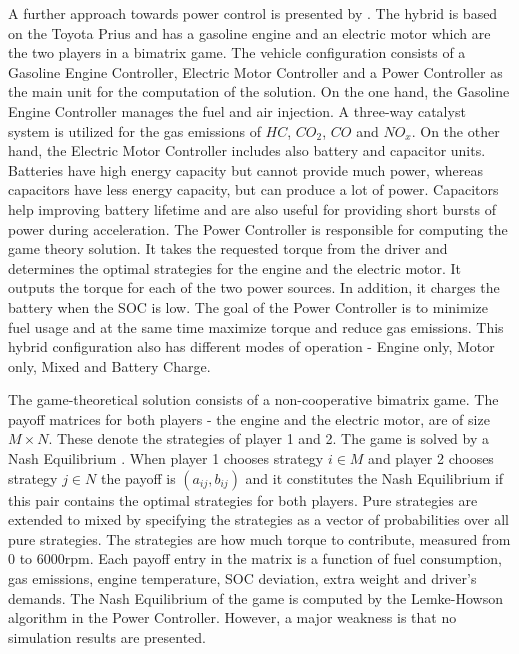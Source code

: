 
A further approach towards power control is presented by \citet{chin2010design}. The hybrid is based on the Toyota Prius and has a gasoline engine and an electric motor which are the two players in a bimatrix game. The vehicle configuration consists of a Gasoline Engine Controller, Electric Motor Controller and a Power Controller as the main unit for the computation of the solution. On the one hand, the Gasoline Engine Controller manages the fuel and air injection. A three-way catalyst system is utilized for the gas emissions of $HC$, $CO_2$, $CO$ and $NO_x$. On the other hand, the Electric Motor Controller includes also battery and capacitor units. Batteries have high energy capacity but cannot provide much power, whereas capacitors have less energy capacity, but can produce a lot of power. Capacitors help improving battery lifetime and are also useful for providing short bursts of power during acceleration. The Power Controller is responsible for computing the game theory solution. It takes the requested torque from the driver and determines the optimal strategies for the engine and the electric motor. It outputs the torque for each of the two power sources. In addition, it charges the battery when the SOC is low. The goal of the Power Controller is to minimize fuel usage and at the same time maximize torque and reduce gas emissions. This hybrid configuration also has different modes of operation - Engine only, Motor only, Mixed and Battery Charge.

The game-theoretical solution consists of a non-cooperative bimatrix game. The payoff matrices for both players - the engine and the electric motor, are of size $M \times N$. These denote the strategies of player 1 and 2. The game is solved by a Nash Equilibrium \citep{nash1951non}. When player 1 chooses strategy $i \in M$ and player 2 chooses strategy $j \in N$ the payoff is $(a_{ij},b_{ij})$ and it constitutes the Nash Equilibrium if this pair contains the optimal strategies for both players. Pure strategies are extended to mixed by specifying the strategies as a vector of probabilities over all pure strategies. The strategies are how much torque to contribute, measured from 0 to 6000rpm. Each payoff entry in the matrix is a function of fuel consumption, gas emissions, engine temperature, SOC deviation, extra weight and driver's demands. The Nash Equilibrium of the game is computed by the Lemke-Howson algorithm \citep{lemke1964equilibrium} in the Power Controller. However, a major weakness is that no simulation results are presented.

